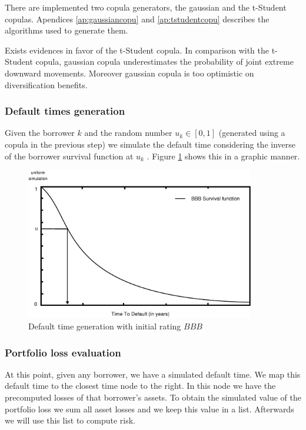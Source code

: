 \documentclass[a4paper,12pt,final]{article}
\begin{document}
There are implemented two copula generators, the gaussian and the t-Student
copulas. Apendices \ref{ap:gaussiancopu} and \ref{ap:tstudentcopu} describes the 
algorithms used to generate them.
\newline

Exists evidences \cite{copu:selecting} in favor of the t-Student copula. 
In comparison with the t-Student copula, gaussian copula underestimates the probability 
of joint extreme downward movements. Moreover gaussian copula is too optimistic on 
diversiﬁcation benefits.

\subsubsection{Default times generation}
Given the borrower $k$ and the random number $u_k \in [0,1]$ (generated using a 
copula in the previous step) we simulate the default time considering the 
inverse of the borrower survival function at $u_k$ \cite{ref:cred_risk}. 
Figure \ref{simttd} shows this in a graphic manner.

\begin{figure}[!hbt]
\begin{center}
\includegraphics[width=10cm,angle=0]{./images/simttd.eps}
\caption{Default time generation with initial rating $BBB$}
\label{simttd}
\end{center}
\end{figure}
\FloatBarrier

\subsubsection{Portfolio loss evaluation}
At this point, given any borrower, we have a simulated default time. We map
this default time to the closest time node to the right. In this node we have 
the precomputed losses of that borrower's assets. To obtain the simulated 
value of the portfolio loss we sum all asset losses and we keep this value 
in a list. Afterwards we will use this list to compute risk.
\end{document}
